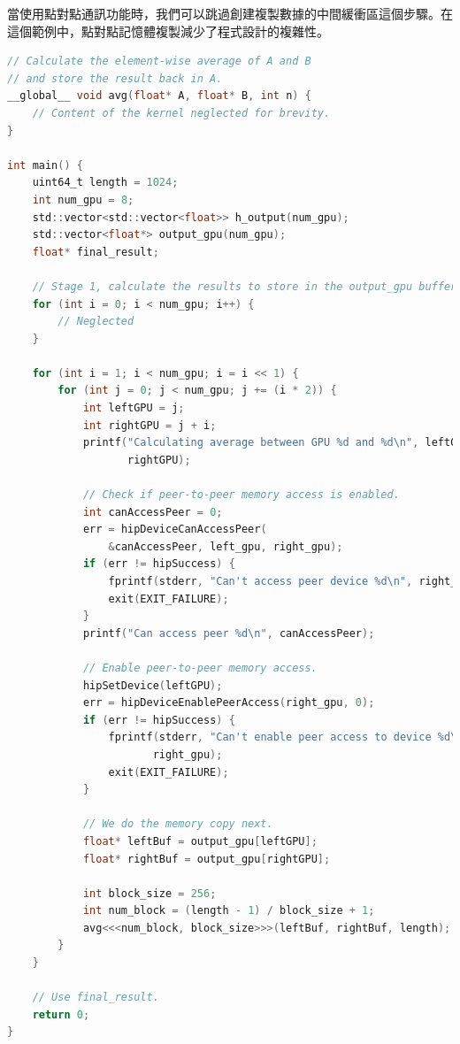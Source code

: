 當使用點對點通訊功能時，我們可以跳過創建複製數據的中間緩衝區這個步驟。在這個範例中，點對點記憶體複製減少了程式設計的複雜性。

\begin{lstlisting}[language=C, caption={用點對點存取達到多GPU溝通}, captionpos=t, label={lst:ptp_multiGPUs}]
// Calculate the element-wise average of A and B
// and store the result back in A.
__global__ void avg(float* A, float* B, int n) {
    // Content of the kernel neglected for brevity.
}

int main() {
    uint64_t length = 1024;
    int num_gpu = 8;
    std::vector<std::vector<float>> h_output(num_gpu);
    std::vector<float*> output_gpu(num_gpu);
    float* final_result;
    
    // Stage 1, calculate the results to store in the output_gpu buffers.
    for (int i = 0; i < num_gpu; i++) {
        // Neglected
    }
    
    for (int i = 1; i < num_gpu; i = i << 1) {
        for (int j = 0; j < num_gpu; j += (i * 2)) {
            int leftGPU = j;
            int rightGPU = j + i;
            printf("Calculating average between GPU %d and %d\n", leftGPU, 
                   rightGPU);
            
            // Check if peer-to-peer memory access is enabled.
            int canAccessPeer = 0;
            err = hipDeviceCanAccessPeer(
                &canAccessPeer, left_gpu, right_gpu);
            if (err != hipSuccess) {
                fprintf(stderr, "Can't access peer device %d\n", right_gpu);
                exit(EXIT_FAILURE);
            }
            printf("Can access peer %d\n", canAccessPeer);
            
            // Enable peer-to-peer memory access.
            hipSetDevice(leftGPU);
            err = hipDeviceEnablePeerAccess(right_gpu, 0);
            if (err != hipSuccess) {
                fprintf(stderr, "Can't enable peer access to device %d\n", 
                       right_gpu);
                exit(EXIT_FAILURE);
            }
            
            // We do the memory copy next.
            float* leftBuf = output_gpu[leftGPU];
            float* rightBuf = output_gpu[rightGPU];
            
            int block_size = 256;
            int num_block = (length - 1) / block_size + 1;
            avg<<<num_block, block_size>>>(leftBuf, rightBuf, length);
        }
    }
    
    // Use final_result.
    return 0;
}
\end{lstlisting}

